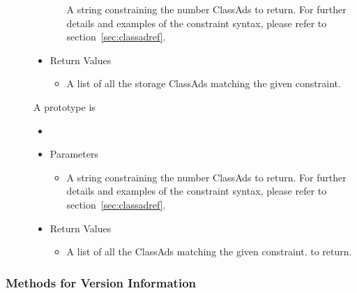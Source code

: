 \begin{description}
\begin{itemize}
\begin{itemize}
      A string constraining the number ClassAds to return. For further details 
      and examples of the constraint syntax, please refer to 
      section~\ref{sec:classadref}.
    \end{itemize}
    \item[] Return Values
    \begin{itemize}
      \item[] A list of all the storage ClassAds matching the given constraint.
    \end{itemize}
  \end{itemize} 

\item [\Code{queryAnyAds}]
  A prototype is 
  
  \begin{itemize}
    \item[] 
    \item[] Parameters
    \begin{itemize}
      \item[]  

      A string constraining the number ClassAds to return. For further details 
      and examples of the constraint syntax, please refer to 
      section~\ref{sec:classadref}.
    \end{itemize}
    \item[] Return Values
    \begin{itemize}
      \item[] A list of all the ClassAds matching the given constraint.
      to return.
    \end{itemize}
  \end{itemize}  

\end{description}

\subsubsection{\label{WebService-VersionInformation} Methods for Version Information}

